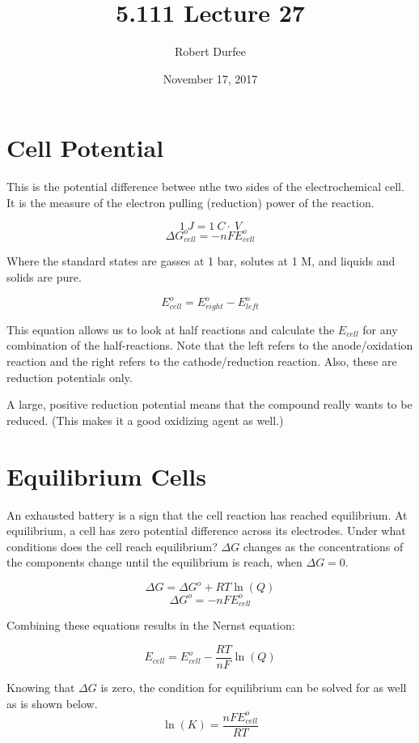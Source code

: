 \documentclass{article}
\title{ 5.111 Lecture 27 }
\author{ Robert Durfee }
\date{ November 17, 2017 }
\begin{document}
\maketitle

\section{ Cell Potential }

This is the potential difference betwee nthe two sides of the electrochemical
cell. It is the measure of the electron pulling (reduction) power of the
reaction.

$$1\ \si{J} = 1\ \si{C} \cdot \ \si{V}$$
$$\Delta G_{cell}^o = - n F E^o_{cell}$$

Where the standard states are gasses at 1 bar, solutes at 1 M, and liquids and
solids are pure.

$$E^o_{cell} = E_{right}^o - E_{left}^o$$

This equation allows us to look at half reactions and calculate the $E_{cell}$
for any combination of the half-reactions. Note that the left refers to the
anode/oxidation reaction and the right refers to the cathode/reduction reaction.
Also, these are reduction potentials only.

A large, positive reduction potential means that the compound really wants to be
reduced. (This makes it a good oxidizing agent as well.)

\section{Equilibrium Cells }

An exhausted battery is a sign that the cell reaction has reached equilibrium.
At equilibrium, a cell has zero potential difference across its electrodes.
Under what conditions does the cell reach equilibrium? $\Delta G$ changes as the
concentrations of the components change until the equilibrium is reach, when
$\Delta G = 0$.

$$\Delta G = \Delta G^o + RT\ln(Q)$$
$$\Delta G^o = -nFE_{cell}^o$$

Combining these equations results in the Nernst equation:

$$E_{cell} = E_{cell}^o -\frac{RT}{nF}\ln(Q)$$

Knowing that $\Delta G$ is zero, the condition for equilibrium can be solved for
as well as is shown below.
$$\ln(K) = \frac{nFE_{cell}^o}{RT}$$
\end{document}
